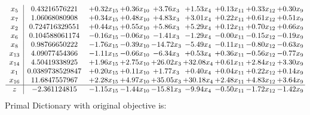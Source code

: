 \documentclass[9pt]{article}
\begin{document}
\[\begin{array}{c| c c@{\hskip 2pt} c@{\hskip 2pt} c@{\hskip 2pt} c@{\hskip 2pt} c@{\hskip 2pt} c@{\hskip 2pt} c@{\hskip 2pt} }
 x_{5}   &  0.43216576221 & +  0.32 x_{15} & +  0.36 x_{10} & +  3.76 x_{3} & +  1.53 x_{4} & +  0.13 x_{11} & +  0.33 x_{12} & +  0.30 x_{9}\\
 x_{7}   &  1.06068080908 & +  0.34 x_{15} & +  0.48 x_{10} & +  4.83 x_{3} & +  3.01 x_{4} & +  0.22 x_{11} & +  0.61 x_{12} & +  0.51 x_{9}\\
 x_{2}   &  0.724716329551 & +  0.44 x_{15} & +  0.55 x_{10} & +  5.86 x_{3} & +  5.29 x_{4} & +  0.12 x_{11} & +  0.70 x_{12} & +  0.66 x_{9}\\
 x_{6}   &  0.104588061174 & -0.16 x_{15} & -0.06 x_{10} & -1.41 x_{3} & -1.29 x_{4} & -0.00 x_{11} & -0.15 x_{12} & -0.19 x_{9}\\
 x_{8}   &  0.98766650222 & -1.76 x_{15} & -0.39 x_{10} & -14.72 x_{3} & -5.49 x_{4} & -0.11 x_{11} & -0.80 x_{12} & -0.63 x_{9}\\
 x_{13}   &  4.09077454366 & -1.11 x_{15} & -0.66 x_{10} & -6.34 x_{3} & +  0.53 x_{4} & +  0.36 x_{11} & -0.56 x_{12} & -0.77 x_{9}\\
 x_{14}   &  4.50419338925 & +  1.96 x_{15} & +  2.75 x_{10} & + 26.02 x_{3} & + 32.08 x_{4} & +  0.61 x_{11} & +  2.84 x_{12} & +  3.30 x_{9}\\
 x_{1}   &  0.0389738529847 & +  0.20 x_{15} & +  0.11 x_{10} & +  1.77 x_{3} & +  0.40 x_{4} & +  0.04 x_{11} & +  0.22 x_{12} & +  0.14 x_{9}\\
 x_{16}   &  11.6847557967 & +  2.28 x_{15} & +  4.97 x_{10} & + 35.05 x_{3} & + 30.18 x_{4} & +  2.48 x_{11} & +  4.83 x_{12} & +  3.64 x_{9}\\
\hline
z    &  -2.361124815 & -1.15 x_{15} & -1.44 x_{10} & -15.81 x_{3} & -9.94 x_{4} & -0.50 x_{11} & -1.72 x_{12} & -1.42 x_{9}\\
\end{array}\]
Primal Dictionary with original objective is:
\end{document}
